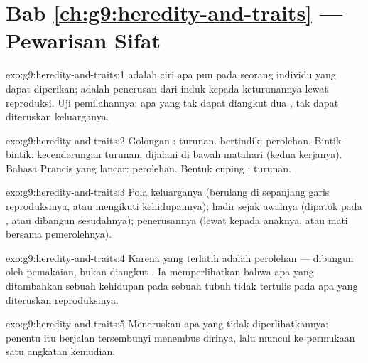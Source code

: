 \section*{Bab \ref{ch:g9:heredity-and-traits} --- Pewarisan Sifat}

\begin{solution}{exo:g9:heredity-and-traits:1}
 adalah ciri apa pun pada seorang individu yang dapat
diperikan;  adalah penerusan  dari induk
kepada keturunannya lewat reproduksi. Uji pemilahannya: apa
yang tak dapat diangkut dua , tak dapat diteruskan
keluarganya.
\end{solution}

\begin{solution}{exo:g9:heredity-and-traits:2}
Golongan : turunan.  bertindik: perolehan.
Bintik-bintik: kecenderungan turunan, dijalani di bawah
matahari (kedua kerjanya). Bahasa Prancis yang lancar:
perolehan. Bentuk cuping : turunan.
\end{solution}

\begin{solution}{exo:g9:heredity-and-traits:3}
Pola keluarganya (berulang di sepanjang garis reproduksinya,
atau mengikuti kehidupannya); hadir sejak awalnya (dipatok
pada , atau dibangun sesudahnya); penerusannya
(lewat kepada anaknya, atau mati bersama pemerolehnya).
\end{solution}

\begin{solution}{exo:g9:heredity-and-traits:4}
Karena  yang terlatih adalah perolehan --- dibangun oleh
pemakaian, bukan diangkut . Ia memperlihatkan bahwa apa
yang ditambahkan sebuah kehidupan pada sebuah tubuh tidak
tertulis pada apa yang diteruskan reproduksinya.
\end{solution}

\begin{solution}{exo:g9:heredity-and-traits:5}
Meneruskan apa yang tidak diperlihatkannya: penentu 
itu berjalan tersembunyi menembus dirinya, lalu muncul ke
permukaan satu angkatan kemudian.
\end{solution}

